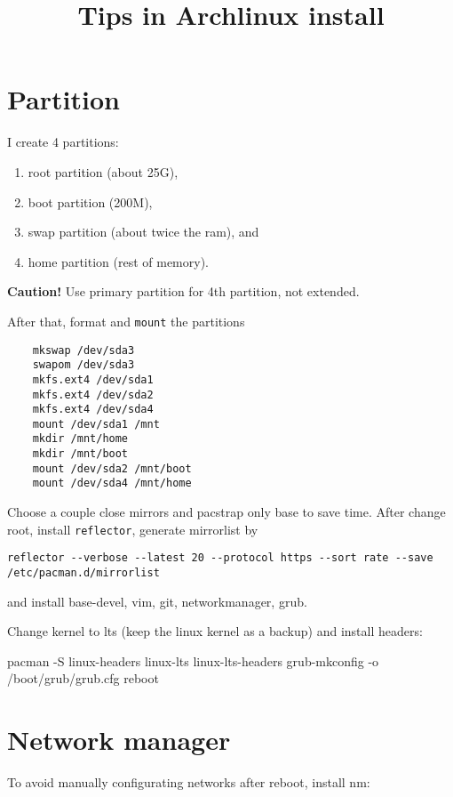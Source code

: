 \documentclass[letterpaper]{article}
\title{Tips in Archlinux install}
\date{}
\begin{document}

\section{Partition}
I create 4 partitions: 
\begin{enumerate}
    \item  root partition (about 25G), 
    \item  boot partition (200M), 
    \item  swap partition (about twice the ram), and 
    \item  home partition (rest of memory).  
\end{enumerate}

\noindent
{\bf Caution!} Use primary partition for 4th partition, not extended. 

\noindent
After that, format and \texttt{mount} the partitions 

\begin{lstlisting}
    mkswap /dev/sda3
    swapom /dev/sda3
    mkfs.ext4 /dev/sda1 
    mkfs.ext4 /dev/sda2 
    mkfs.ext4 /dev/sda4 
    mount /dev/sda1 /mnt
    mkdir /mnt/home
    mkdir /mnt/boot
    mount /dev/sda2 /mnt/boot
    mount /dev/sda4 /mnt/home
\end{lstlisting}
Choose a couple close mirrors and pacstrap only base to save time.
After change root, install \lstinline{reflector}, generate mirrorlist by 
\begin{lstlisting}
reflector --verbose --latest 20 --protocol https --sort rate --save /etc/pacman.d/mirrorlist
\end{lstlisting}

and install base-devel, vim, git, networkmanager, grub.

Change kernel to lts (keep the linux kernel as a backup) 
and install headers: 

pacman -S linux-headers linux-lts linux-lts-headers 
grub-mkconfig -o /boot/grub/grub.cfg
reboot



\section{Network manager}
To avoid manually configurating networks after reboot, install nm:
\end{document}
